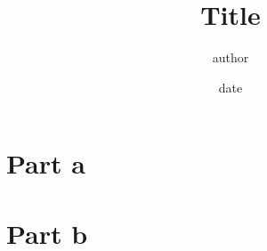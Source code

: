 \documentclass[12pt]{article}
\title{Title}
\date{date}
\author{author}
\begin{document}
\maketitle
\section*{Part a}
\blindtext

\section*{Part b}
\blindtext
\end{document}
